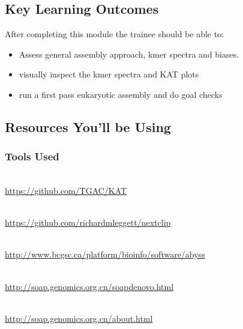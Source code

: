 
\chapter{\moduleTitle}
\newpage


\section{Key Learning Outcomes}

After completing this module the trainee should be able to:
\begin{itemize}
  \item Assess general assembly approach, kmer spectra and biases.
  \item visually inspect the kmer spectra and KAT plots
  \item run a first pass eukaryotic assembly and do goal checks 
\end{itemize}

\section{Resources You'll be Using}
 
\subsection{Tools Used}
\begin{description}[style=multiline,labelindent=0cm,align=left,leftmargin=0.5cm]
  \item[Kmer Analysis Tool kit]\hfill\\
  	\url{https://github.com/TGAC/KAT}
  \item[Nextclip]\hfill\\
  	\url{https://github.com/richardmleggett/nextclip}
  \item[Abyss]\hfill\\
  	\url{http://www.bcgsc.ca/platform/bioinfo/software/abyss}
  \item[Soap Denovo]\hfill\\
  	\url{http://soap.genomics.org.cn/soapdenovo.html}
  \item[SOAPec]\hfill\\
  	\url{http://soap.genomics.org.cn/about.html}
\end{description}

